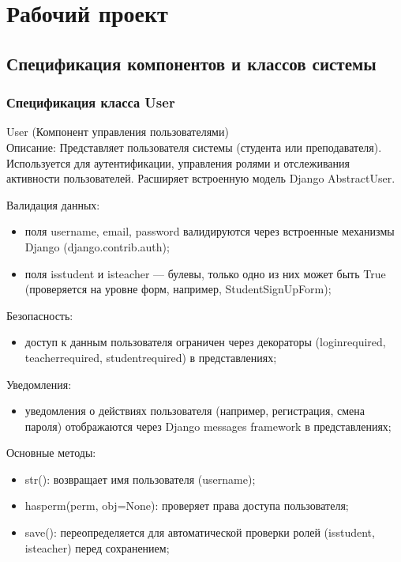 \section{Рабочий проект}


\subsection{Спецификация компонентов и классов системы}

\subsubsection{Спецификация класса User}
User (Компонент управления пользователями) \\
Описание: Представляет пользователя системы (студента или преподавателя). Используется для аутентификации, управления ролями и отслеживания активности пользователей. Расширяет встроенную модель Django AbstractUser.

Валидация данных: 
\begin{itemize}
	\item поля username, email, password валидируются через встроенные механизмы Django (django.contrib.auth); 
	\item поля isstudent и isteacher — булевы, только одно из них может быть True (проверяется на уровне форм, например, StudentSignUpForm); 
\end{itemize}

Безопасность: 
\begin{itemize}
	\item доступ к данным пользователя ограничен через декораторы (loginrequired, teacherrequired, studentrequired) в представлениях; 
\end{itemize}

Уведомления: 
\begin{itemize}
	\item уведомления о действиях пользователя (например, регистрация, смена пароля) отображаются через Django messages framework в представлениях; 
\end{itemize}

Основные методы: 
\begin{itemize}
	\item str(): возвращает имя пользователя (username); 
	\item hasperm(perm, obj=None): проверяет права доступа пользователя; 
	\item save(): переопределяется для автоматической проверки ролей (isstudent, isteacher) перед сохранением; 
\end{itemize}

